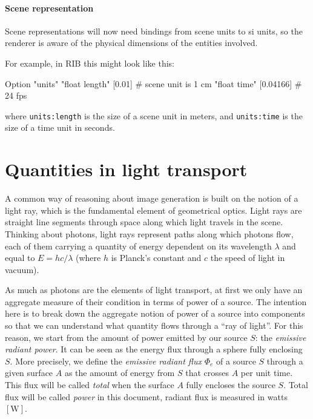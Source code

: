 \paragraph{Scene representation}

Scene representations will now need bindings from scene units to \gls{si} units,
so the renderer is aware of the physical dimensions of the entities involved.

For example, in \gls{RIB} this might look like this:

\begin{ribcode}
Option "units" "float length" [0.01]    # scene unit is 1 cm
               "float time"   [0.04166] # 24 fps
\end{ribcode}
where \Verb/units:length/ is the size of a scene unit in meters,
and \Verb/units:time/ is the size of a time unit in seconds.

\section{Quantities in light transport}

A common way of reasoning about image generation is built on the notion of a
light ray, which is the fundamental element of geometrical optics. Light rays
are straight line segments through space along which light travels in the scene.
Thinking about photons, light rays represent paths along which photons flow,
each of them carrying a quantity of energy dependent on its wavelength $\lambda$
and equal to $E = hc/\lambda$ (where $h$ is Planck's constant and $c$ the speed
of light in vacuum).

As much as photons are the elements of light transport, at first we only have an
aggregate measure of their condition in terms of power of a source.
The intention here is to break down the aggregate notion of power of a source
into components so that we can understand what quantity flows through a ``ray of
light''.
For this reason, we start from the amount of power emitted by our source $S$:
the \textsl{emissive radiant power}.
It can be seen as the energy flux through a sphere fully enclosing $S$.
More precisely, we define the \textsl{emissive radiant flux} $\Phi_e$ of a
source $S$ through a given surface $A$ as the amount of energy from $S$ that
crosses $A$ per unit time. This flux will be called \textsl{total} when the surface
$A$ fully encloses the source $S$. Total flux will be called \textsl{power} in
this
document, radiant flux is measured in watts $[\unit{\watt}]$.

